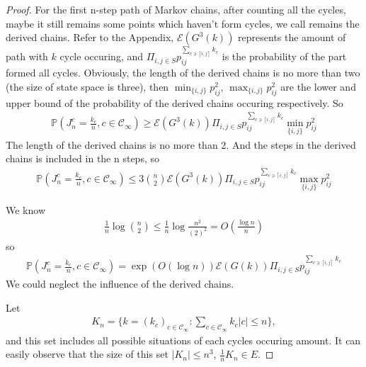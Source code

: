 \documentclass[11pt,en,cite=authoryear]{elegantpaper}
\begin{document}
\begin{proof}
    For the first n-step path of Markov chains, after counting all the cycles, maybe it still remains some points which haven't form cycles, we call remains the derived chains.
    Refer to the Appendix, $\mathcal{E} (G^3(k))$ represents the amount of path with $k$ cycle occuring, and $\Pi_{i,j \in S} p_{ij}^{\sum_{c \ni [i,j]} k_{c}} $ is the probability of the part formed all cycles. Obviously, the length of the derived chains is no more than two (the size of state space is three), then
    $\min_{\{i, j\}} p_{ij}^{2}$, $\max_{\{i, j\}} p_{ij}^2$ are the lower and upper bound of the probability of the derived chains occuring respectively. So
    \begin{align*}
        \mathbb{P}(J_{n}^c= \frac{k_c}{n}, c \in \mathcal{C}_{\infty}) 
        \ge \mathcal{E} (G^3(k)) \Pi_{i,j \in S} p_{ij}^{\sum_{c \ni [i,j]} k_{c}}
        \min_{\{i, j\}} p_{ij}^{2}
    \end{align*}
    The length of the derived chains is no more than 2. And the steps in the derived chains is included in the n steps, so
    \begin{align*}
        \mathbb{P}(J_{n}^c = \frac{k_c}{n}, c \in \mathcal{C}_{\infty}) 
        \le 3\binom{n}{2}
        \mathcal{E} (G^3(k)) \Pi_{i,j \in S} p_{ij}^{\sum_{c \ni [i,j]} k_{c}}
        \max_{\{i, j\}} p_{ij}^2
    \end{align*}

    We know
    \begin{align*}
        \frac{1}{n} \log \binom{n}{2} \le \frac{1}{n} \log \frac{n^2}{(2)^{2}}
        = O(\frac{\log n}{n})
    \end{align*}
    so 
    \begin{align*}
        \mathbb{P}(J_{n}^c = \frac{k_c}{n}, c \in \mathcal{C}_{\infty}) 
        = \exp(O (\log n))
        \mathcal{E} (G(k)) \Pi_{i,j \in S} p_{ij}^{\sum_{c \ni [i,j]} k_{c}}
    \end{align*}
    We could neglect the influence of the derived chains.

    Let
    \begin{align*}
        K_n = \biggl\{k=(k_c)_{c\in \mathcal{C}_{\infty}}: \sum_{c \in \mathcal{C}_{\infty}} k_{c} |c| \le n \biggr\},
    \end{align*}
    and this set includes all possible situations of each cycles occuring amount. It can easily observe that the size of this set $|K_n| \le n^3$, $\frac{1}{n} K_n \in E$. 


\end{proof}
\end{document}
